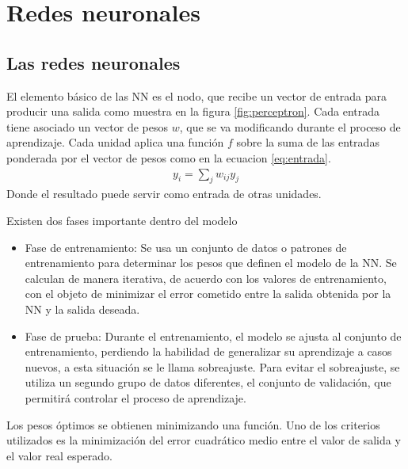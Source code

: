 \chapter{Redes neuronales}

\section{Las redes neuronales}
El elemento básico de las NN es el nodo, que recibe un vector de entrada para producir una salida como muestra en la figura \ref{fig:perceptron}. Cada entrada tiene asociado un vector de pesos $w$, que se va modificando durante el proceso de aprendizaje. Cada unidad aplica una función $f$ sobre la suma de las entradas ponderada por el vector de pesos como en la ecuacion \ref{eq:entrada}.
\begin{eqnarray}
	y_{i} = \sum_{j} w_{ij}y_{j}\label{eq:entrada}
\end{eqnarray}
Donde el resultado puede servir como entrada de otras unidades.

Existen dos fases importante dentro del modelo
\begin{itemize}
	\item Fase de entrenamiento: Se usa un conjunto de datos o patrones de entrenamiento para determinar los pesos que definen el modelo de la NN. Se calculan de manera iterativa, de acuerdo con los valores de entrenamiento, con el objeto de minimizar el error cometido entre la salida obtenida por la NN y la salida deseada.

	\item Fase de prueba: Durante el entrenamiento, el modelo se ajusta al conjunto de entrenamiento, perdiendo la habilidad de generalizar su aprendizaje a casos nuevos, a esta situación se le llama sobreajuste.
	Para evitar el sobreajuste, se utiliza un segundo grupo de datos diferentes, el conjunto de validación, que permitirá controlar el proceso de aprendizaje.
\end{itemize}
Los pesos óptimos se obtienen minimizando una función. Uno de los criterios utilizados es la minimización del error cuadrático medio entre el valor de salida y el valor real esperado.






